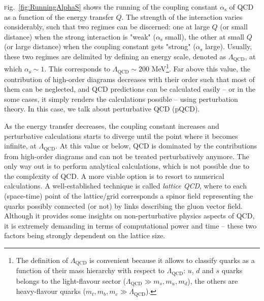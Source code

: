 \documentclass[ALICE,manyauthors]{cernphprep}
\newcommand{\Fig}       {\textsc{f}ig.~}
\newcommand {\alphaS}       {\mbox{$\alpha_{\textrm{s}}$}\xspace}
\newcommand{\LambdaQCD}     {\mbox{$\Lambda_{\textrm{QCD}}$}\xspace}
\providecommand{\DIFaddtex}[1]{{\protect\color{blue}\uwave{#1}}} %
\providecommand{\DIFdeltex}[1]{{\protect\color{red}\sout{#1}}}                      %
\providecommand{\DIFaddbegin}{} %
\providecommand{\DIFaddend}{} %
\providecommand{\DIFdelbegin}{} %
\providecommand{\DIFdelend}{} %
\providecommand{\DIFadd}[1]{\texorpdfstring{\DIFaddtex{#1}}{#1}} %
\providecommand{\DIFdel}[1]{\texorpdfstring{\DIFdeltex{#1}}{}} %
\newcommand{\DIFscaledelfig}{0.5}
\newlength{\DIFdelgraphicswidth} %
\newlength{\DIFdelgraphicsheight} %
\newcommand{\DIFaddincludegraphics}[2][]{{\color{blue}\fbox{\DIFOincludegraphics[#1]{#2}}}} %
\newcommand{\DIFdelincludegraphics}[2][]{%
\sbox{\DIFdelgraphicsbox}{\DIFOincludegraphics[#1]{#2}}%
\settoboxwidth{\DIFdelgraphicswidth}{\DIFdelgraphicsbox} %
\settoboxtotalheight{\DIFdelgraphicsheight}{\DIFdelgraphicsbox} %
\scalebox{\DIFscaledelfig}{%
\parbox[b]{\DIFdelgraphicswidth}{\usebox{\DIFdelgraphicsbox}\\[-\baselineskip] \rule{\DIFdelgraphicswidth}{0em}}\llap{\resizebox{\DIFdelgraphicswidth}{\DIFdelgraphicsheight}{%
\setlength{\unitlength}{\DIFdelgraphicswidth}%
\begin{picture}(1,1)%
\thicklines\linethickness{2pt} %
{\color[rgb]{1,0,0}\put(0,0){\framebox(1,1){}}}%
{\color[rgb]{1,0,0}\put(0,0){\line( 1,1){1}}}%
{\color[rgb]{1,0,0}\put(0,1){\line(1,-1){1}}}%
\end{picture}%
}\hspace*{3pt}}} %
} %
\DeclareRobustCommand{\DIFaddbegin}{\DIFOaddbegin \let\includegraphics\DIFaddincludegraphics} %
\DeclareRobustCommand{\DIFaddend}{\DIFOaddend \let\includegraphics\DIFOincludegraphics} %
\DeclareRobustCommand{\DIFdelbegin}{\DIFOdelbegin \let\includegraphics\DIFdelincludegraphics} %
\DeclareRobustCommand{\DIFdelend}{\DIFOaddend \let\includegraphics\DIFOincludegraphics} %
\begin{document}
\Fig\ref{fig:RunningAlphaS} shows the running of the coupling constant \alphaS of QCD as a function of the energy transfer $Q$. The strength of the interaction varies considerably, such that two regimes can be discerned: one at large $Q$ (or small distance) when the strong interaction is "weak" (\alphaS small), the other at small $Q$ (or large distance) when the coupling constant gets "strong" (\alphaS large). Usually, these two regimes are delimited by defining an energy scale, denoted as \LambdaQCD, at which $\alphaS \sim 1$. This corresponds to $\LambdaQCD \sim 200$ MeV\footnote{The definition of \LambdaQCD is convenient because it allows to classify quarks as a function of their mass hierarchy with respect to \LambdaQCD: $u$, $d$ and $s$ quarks belongs to the light-flavour sector (\DIFdelbegin \DIFdel{$\LambdaQCD \gg m_{s}, m_{u}, m_{d}$}\DIFdelend \DIFaddbegin \DIFadd{$\LambdaQCD \ll m_{s}, m_{u}, m_{d}$}\DIFaddend ), the others are heavy-flavour quarks ($m_{t}, m_{b}, m_{c} \gg \LambdaQCD$).}. Far above this value, the contribution of high-order diagrams decreases with their order such that most of them can be neglected, and QCD predictions can be calculated easily -- or in the some cases, it simply renders the calculations possible -- using perturbation theory. In this case, we talk about perturbative QCD (pQCD).

As the energy transfer decreases, the coupling constant increases and perturbative calculations starts to diverge until the point where it becomes infinite, at \LambdaQCD. At this value or below, QCD is dominated by the contributions from high-order diagrams and can not be treated perturbatively anymore. The only way out is to perform analytical calculations, which is not possible due to the complexity of QCD. A more viable option is to resort to numerical calculations. A well-established technique is called \textit{lattice QCD}, where to each (space-time) point of the lattice/grid corresponds a spinor field representing the quarks possibly connected (or not) by links describing the gluon vector field. Although it provides some insights on non-perturbative physics aspects of QCD, it is extremely demanding in terms of computational power and time -- these two factors being strongly dependent on the lattice size.\\
\end{document}
